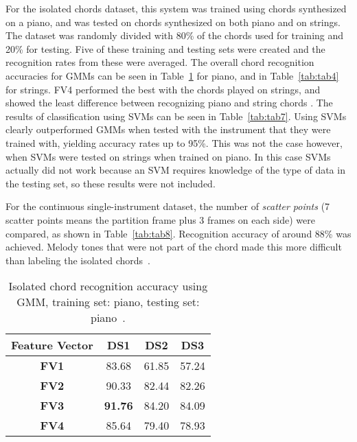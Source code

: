 \documentclass{sig-alternate}
\begin{document}
For the isolated chords dataset, this system was trained using chords synthesized on a piano, and was tested on chords synthesized on both piano and on strings. The dataset was randomly divided with 80\% of the chords used for training and 20\% for testing. Five of these training and testing sets were created and the recognition rates from these were averaged. The overall chord recognition accuracies for GMMs can be seen in Table~\ref{tab:tab3} for piano, and in Table~\ref{tab:tab4} for strings. FV4 performed the best with the chords played on strings, and showed the least difference between recognizing piano and string chords \cite{Morman:2006}. The results of classification using SVMs can be seen in Table~\ref{tab:tab7}. Using SVMs clearly outperformed GMMs when tested with the instrument that they were trained with, yielding accuracy rates up to 95\%. This was not the case however, when SVMs were tested on strings when trained on piano. In this case SVMs actually did not work because an SVM requires knowledge of the type of data in the testing set, so these results were not included.  

For the continuous single-instrument dataset, the number of \textit{scatter points} (7 scatter points means the partition frame plus 3 frames on each side) were compared, as shown in Table~\ref{tab:tab8}. Recognition accuracy of around 88\% was achieved. Melody tones that were not part of the chord made this more difficult than labeling the isolated chords~\cite{Morman:2006}. 



\begin{table}[h]
\centering
\begin{tabular}{|c|c|c|c|} \hline
\textbf{Feature Vector} & \textbf{DS1} & \textbf{DS2} & \textbf{DS3} \\ \hline
\textbf{FV1} & 83.68 & 61.85 & 57.24 \\ \hline
\textbf{FV2} & 90.33 & 82.44 & 82.26 \\ \hline
\textbf{FV3} & \textbf{91.76} & 84.20 & 84.09 \\ \hline
\textbf{FV4} & 85.64 & 79.40 & 78.93 \\ \hline
\end{tabular}
\caption{Isolated chord recognition accuracy using GMM, training set: piano, testing set: piano~\cite{Morman:2006}.}
\label{tab:tab3}
\end{table} 
\end{document}
